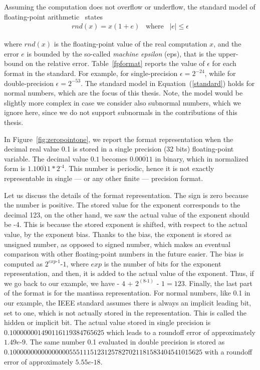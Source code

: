 Assuming the computation does not overflow or underflow, the standard model of floating-point arithmetic~\cite{every} states
%
\begin{align}
rnd(x)=x(1+e)\;\;\;\text{where}\;\;\;|e|\leq\epsilon
\label{standard}
\end{align}
%

where $rnd(x)$ is the floating-point value of the real computation $x$, and the error $e$ is bounded by the so-called \emph{machine epsilon} (eps), that is the upper-bound on the relative error.
%
Table~\ref{fpformat} reports the value of $\epsilon$ for each format in the standard.
%
For example, for single-precision $\epsilon=2^{-24}$, while for double-precision $\epsilon=2^{-53}$.
%
The standard model in Equation~(\ref{standard}) holds for normal numbers, which are the focus of this thesis.
%
Note, the model would be slightly more complex in case we consider also subnormal numbers, which we ignore here, since we do not support subnormals in the contributions of this thesis.
%

In Figure~\ref{fig:zeropointone}, we report the format representation when the decimal real value 0.1 is stored in a single precision (32 bits) floating-point variable.
%
The decimal value $0.1$ becomes $0.0\overline{0011}$ in binary, which in normalized form is $1.1\overline{0011}*2^{\text{-}4}$.
%
This number is periodic, hence it is not exactly representable in single --- or any other finite --- precision format.
%

Let us discuss the details of the format representation.
%
The sign is zero because the number is positive.
%
The stored value for the exponent corresponds to the decimal 123, on the other hand, we saw the actual value of the exponent should be -4.
%
This is because the stored exponent is shifted, with respect to the actual value, by the exponent bias. 
%
Thanks to the bias, the exponent is stored as unsigned number, as opposed to signed number, which makes an eventual comparison with other floating-point numbers in the future easier.
%
The bias is computed as $2^{exp\text{-}1}\text{-}1$, where $exp$ is the number of bits for the exponent representation, and then, it is added to the actual value of the exponent.
%
Thus, if we go back to our example, we have $\text{- }4\text{ + }2^{(8\text{-}1)}\text{ - }1=123$.
%
Finally, the last part of the format is for the mantissa representation. 
%
For normal numbers, like 0.1 in our example, the IEEE standard assumes there is always an implicit leading bit, set to one, which is not actually stored in the representation.
%
%
This is called the hidden or implicit bit.
%
The actual value stored in single precision is $0.100000001490116119384765625$ which leads to a roundoff error of approximately $1.49e\text{-}9$.
%
The same number 0.1 evaluated in double precision is stored as \\ $0.1000000000000000055511151231257827021181583404541015625$ with a roundoff error of approximately $5.55e\text{-}18$.
%
